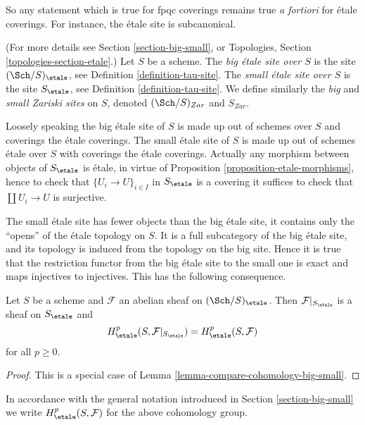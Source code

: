 \noindent
So any statement which is true for fpqc coverings
remains true {\it a fortiori} for \'etale coverings. For
instance, the \'etale site is subcanonical.

\begin{definition}
\label{definition-big-etale-site}
(For more details see Section \ref{section-big-small}, or
Topologies, Section \ref{topologies-section-etale}.)
Let $S$ be a scheme.
The {\it big \'etale site over $S$} is the site
$(\Sch/S)_\etale$, see
Definition \ref{definition-tau-site}.
The {\it small \'etale site over $S$} is the site $S_\etale$, see
Definition \ref{definition-tau-site}.
We define similarly the {\it big} and {\it small Zariski sites} on $S$,
denoted $(\Sch/S)_{Zar}$ and $S_{Zar}$.
\end{definition}

\noindent
Loosely speaking the big \'etale site of $S$ is made up out of schemes over $S$
and coverings the \'etale coverings. The small \'etale site of $S$ is made up
out of schemes \'etale over $S$ with coverings the \'etale coverings.
Actually any morphism between objects of $S_\etale$ is \'etale, in
virtue of
Proposition \ref{proposition-etale-morphisms},
hence to check that $\{U_i \to U\}_{i \in I}$ in $S_\etale$
is a covering it suffices to check that $\coprod U_i \to U$ is surjective.

\medskip\noindent
The small \'etale site has fewer objects than the big \'etale site, it
contains only the ``opens'' of the \'etale topology on $S$. It is a full
subcategory of the big \'etale site, and its topology is induced from the
topology on the big site. Hence it is true that the restriction functor
from the big \'etale site to the small one is exact and maps injectives to
injectives. This has the following consequence.

\begin{proposition}
\label{proposition-cohomology-restrict-small-site}
Let $S$ be a scheme and $\mathcal{F}$ an abelian sheaf on
$(\Sch/S)_\etale$.
Then $\mathcal{F}|_{S_\etale}$ is a sheaf on $S_\etale$ and
$$
H^p_\etale(S, \mathcal{F}|_{S_\etale}) =
H^p_\etale(S, \mathcal{F})
$$
for all $p \geq 0$.
\end{proposition}

\begin{proof}
This is a special case of Lemma \ref{lemma-compare-cohomology-big-small}.
\end{proof}

\noindent
In accordance with the general notation introduced in
Section \ref{section-big-small}
we write $H_\etale^p(S, \mathcal{F})$ for the above cohomology group.





